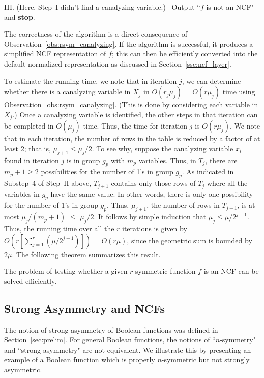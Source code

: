 \smallskip
\noindent
III. (Here, Step~I didn't find a canalyzing variable.)~ 
Output ``$f$ is not an NCF" and \textbf{stop}.

\medskip
\noindent
The correctness of the algorithm is a direct consequence of
Observation~\ref{obs:rsym_canalyzing}. If the algorithm is successful,
it produces a simplified NCF representation of $f$; this can then be
efficiently converted into the default-normalized representation as
discussed in Section~\ref{sse:ncf_layer}.

To estimate the running time, we note that in iteration $j$, we can
determine whether there is a canalyzing variable in $X_j$
in $O(r_j \mu_j)$ = $O(r \mu_j)$ time using 
Observation~\ref{obs:rsym_canalyzing}.
(This is done by considering each variable in $X_j$.)
Once a canalyzing variable is identified, the other steps in that iteration
can be completed in $O(\mu_j)$ time.
Thus, the time for iteration $j$ is $O(r \mu_j)$.
We note that in each iteration, the number of rows in the table
is reduced by a factor of at least 2; that is, $\mu_{j+1} \leq \mu_j/2$.
To see why, suppose the canalyzing variable $x_i$ found in iteration $j$
is in group $g_p$ with $m_p$ variables. 
Thus, in $T_j$, there are $m_p+1 \geq 2$ possibilities for the number of 1's 
in group $g_p$. 
As indicated in Substep~4 of Step~II above, $T_{j+1}$ 
contains only those rows of $T_j$ where all the variables 
in $g_p$ have the same value.
In other words, there is only one possibility for the number of
1's in group $g_p$.
Thus, $\mu_{j+1}$, the number of rows in $T_{j+1}$,
is at most $\mu_j/(m_p+1)$ $\leq$ $\mu_j/2$.
It follows by simple induction that $\mu_j \leq \mu/2^{j-1}$.
Thus, the running time over all the $r$ iterations is given by
$O(r [\sum_{j=1}^{r}(\mu/2^{j-1})])$ = $O(r\mu)$, since the
geometric sum is bounded by $2\mu$.
The following theorem summarizes this result. 

\begin{theorem}\label{thm:rsym_canalyzing}
The problem of testing whether a given 
$r$-symmetric function $f$ is an NCF can 
be solved efficiently. \QED
\end{theorem}

\subsection{Strong Asymmetry and NCFs}
\label{sse:strong_asym_ncf}

The notion of strong asymmetry of Boolean functions was defined 
in Section~\ref{sec:prelim}.
For general Boolean functions, the notions of ``$n$-symmetry" and
``strong asymmetry" are not equivalent. 
We illustrate this by presenting an example of a Boolean function
which is properly $n$-symmetric but not strongly asymmetric.

